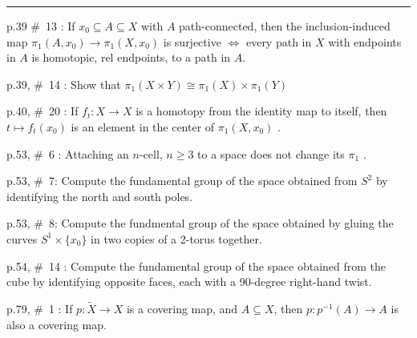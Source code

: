 \bigskip


\hrule


\bigskip




\medskip


p.39 \#\ 13 : If $x_0\subseteq A\subseteq X$ with $A$ path-connected, then the inclusion-induced map 
$\pi_1(A,x_0)\rightarrow \pi_1(X,x_0)$ is surjective 
$\Leftrightarrow$ 
every path in $X$ with endpoints in $A$  is homotopic, rel endpoints, to a path in $A$.



\msk



p.39, \#\ 14 : Show that $\pi_1(X\times Y)\cong \pi_1(X)\times \pi_1(Y)$



\msk



p.40, \#\ 20 : If $f_t: X\rightarrow X$ is a homotopy from the identity map to 
itself, then 
$t\mapsto f_t(x_0)$ is an element in the center of $\pi_1(X,x_0)$ .



\msk



p.53, \#\ 6 : Attaching an $n$-cell, $n\geq 3$ to a space does not change its 
$\pi_1$ .



\msk



p.53, \#\ 7: Compute the fundamental group of the space obtained from $S^2$ by identifying 
the north and south poles.



\msk



p.53, \#\ 8: Compute the fundmental group of the space obtained by gluing the curves 
$S^1\times\{x_0\}$ in two copies of a 2-torus together.



\msk



p.54, \#\ 14 : Compute the fundamental group of the space obtained from the cube by identifying 
opposite faces, each with a 90-degree right-hand twist.



\msk



p.79, \#\ 1 : If $p:\widetilde{X}\rightarrow X$ is a covering map, and $A\subseteq X$,
then $p: p^{-1}(A)\rightarrow A$ is also a covering map.



